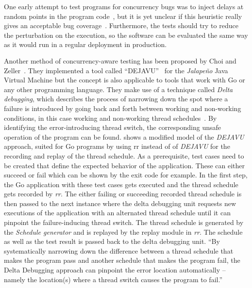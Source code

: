 \documentclass[conference]{IEEEtran}
\begin{document}
One early attempt to test programs for concurrency bugs was to inject delays at random points in the program code~\cite{bron2005coverage}, but it is yet unclear if this heuristic really gives an acceptable bug coverage~\cite{lu2008mistakes}.
Furthermore, the tests should try to reduce the perturbation on the execution, so the software can be evaluated the same way as it would run in a regular deployment in production.

Another method of concurrency-aware testing has been proposed by Choi and Zeller~\cite{acm2002}.
They implemented a tool called ``DEJAVU''~\cite{acm2002} for the \emph{Jalapeño} Java Virtual Machine but the concept is also applicable to tools that work with Go or any other programming language.
They make use of a technique called \emph{Delta debugging}, which describes the process of narrowing down the spot where a failure is introduced by going back and forth between working and non-working conditions, in this case working and non-working thread schedules~\cite{zeller2002delta}.
By identifying the error-introducing thread switch, the corresponding unsafe operation of the program can be found.
 shows a modified model of the \emph{DEJAVU} approach, suited for Go programs by using rr instead of of \emph{DEJAVU} for the recording and replay of the thread schedule.
As a prerequisite, test cases need to be created that define the expected behavior of the application.
These can either succeed or fail which can be shown by the exit code for example.
In the first step, the Go application with these test cases gets executed and the thread schedule gets recorded by \emph{rr}.
The either failing or succeeding recorded thread schedule is then passed to the next instance where the delta debugging unit requests new executions of the application with an alternated thread schedule until it can pinpoint the failure-inducing thread switch.
The thread schedule is generated by the \emph{Schedule generator} and is replayed by the replay module in \emph{rr}.
The schedule as well as the test result is passed back to the delta debugging unit.
``By systematically narrowing down the difference between a thread schedule that makes the program pass and another schedule that makes the program fail, the Delta Debugging approach can pinpoint the error location automatically -- namely the location(s) where a thread switch causes the program to fail.''~\cite{acm2002}
\end{document}
